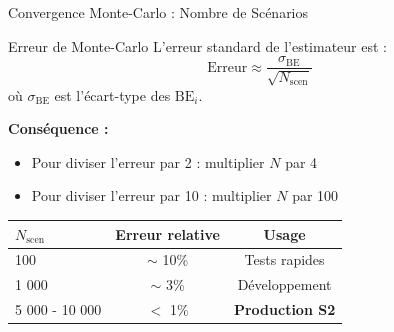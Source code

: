 \documentclass[10pt,aspectratio=169]{beamer}
\newcommand{\BE}{\text{BE}}
\begin{document}
\begin{frame}{Convergence Monte-Carlo : Nombre de Scénarios}
\begin{block}{Erreur de Monte-Carlo}
L'erreur standard de l'estimateur est :
\[
\text{Erreur} \approx \frac{\sigma_{\BE}}{\sqrt{N_{\text{scen}}}}
\]
où $\sigma_{\BE}$ est l'écart-type des $\BE_i$.
\end{block}

\textbf{Conséquence :}
\begin{itemize}
    \item Pour diviser l'erreur par 2 : multiplier $N$ par 4
    \item Pour diviser l'erreur par 10 : multiplier $N$ par 100
\end{itemize}

\vspace{0.3cm}
\begin{table}
\centering
\begin{tabular}{lcc}
\toprule
\textbf{$N_{\text{scen}}$} & \textbf{Erreur relative} & \textbf{Usage} \\
\midrule
100 & $\sim$ 10\% & Tests rapides \\
1 000 & $\sim$ 3\% & Développement \\
\rowcolor{green!20}
5 000 - 10 000 & $<$ 1\% & \textbf{Production S2} \\
\bottomrule
\end{tabular}
\end{table}
\end{frame}
\end{document}
